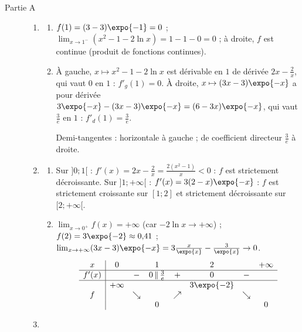 \begin{description}
	\item[Partie A]
	\begin{enumerate}
		\item
		\begin{enumerate}
			\item {}
				$f(1) = (3 - 3)\expo{-1} = 0$ ; $\lim_{x\to 1^-} \left(x^2 - 1 - 2\ln x\right) = 1 - 1 - 0 = 0$ ; à droite, $f$ est continue (produit de fonctions continues).
				\par\noindent{}
			\item {}
				À gauche, $x \mapsto x^2 - 1 - 2\ln x$ est dérivable en $1$ de dérivée $2x - \frac{2}{x}$, qui vaut $0$ en $1$ : $f'_g(1) = 0$.
				À droite, $x \mapsto (3x - 3)\expo{-x}$ a pour dérivée $3\expo{-x} - (3x - 3)\expo{-x} = (6 - 3x)\expo{-x}$, qui vaut $\frac{3}{e}$ en $1$ : $f'_d(1) = \frac{3}{e}$.
				\par\noindent{}
				Demi-tangentes : horizontale à gauche ; de coefficient directeur $\frac{3}{e}$ à droite.
		\end{enumerate}
		\item
		\begin{enumerate}
			\item {}
				Sur $]0;1[$ : $f'(x) = 2x - \frac{2}{x} = \frac{2(x^2 - 1)}{x} < 0$ : $f$ est strictement décroissante.
				Sur $]1;+\infty[$ : $f'(x) = 3(2 - x)\expo{-x}$ : $f$ est strictement croissante sur $[1;2]$ et strictement décroissante sur $[2;+\infty[$.
			\item {}
				$\lim_{x\to 0^+} f(x) = +\infty$ (car $-2\ln x \to +\infty$) ; $f(2) = 3\expo{-2} \approx 0{,}41$ ;
				$\lim_{x\to+\infty} (3x - 3)\expo{-x} = 3\frac{x}{\expo{x}} - \frac{3}{\expo{x}} \to 0$.
				\[
				\begin{array}{c|ccccccc}
					x & 0 & & 1 & & 2 & & +\infty \\ \hline
					f'(x) & & - & 0 \,\|\, \frac{3}{e} & + & 0 & - & \\ \hline
					 & +\infty & & & & 3\expo{-2} & & \\
					f & & \searrow & & \nearrow & & \searrow & \\
					 & & & 0 & & & & 0
				\end{array}
				\]
		\end{enumerate}
		\item

\end{enumerate}
\end{description}
